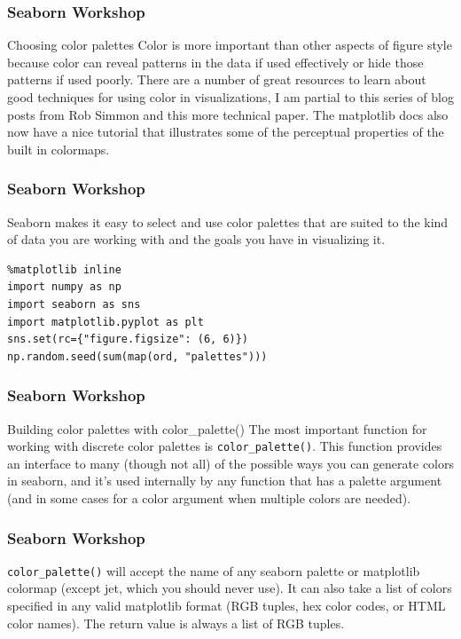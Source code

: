 \documentclass{beamer}
\begin{document}
\begin{frame}[fragile]
\frametitle{Seaborn Workshop}
\large

Choosing color palettes
Color is more important than other aspects of figure style because color can reveal patterns in the data if used effectively or hide those patterns if used poorly. There are a number of great resources to learn about good techniques for using color in visualizations, I am partial to this series of blog posts from Rob Simmon and this more technical paper. The matplotlib docs also now have a nice tutorial that illustrates some of the perceptual properties of the built in colormaps.
\end{frame}
\begin{frame}[fragile]
\frametitle{Seaborn Workshop}
\large
Seaborn makes it easy to select and use color palettes that are suited to the kind of data you are working with and the goals you have in visualizing it.
\begin{framed}
\begin{verbatim}
%matplotlib inline
import numpy as np
import seaborn as sns
import matplotlib.pyplot as plt
sns.set(rc={"figure.figsize": (6, 6)})
np.random.seed(sum(map(ord, "palettes")))
\end{verbatim}
\end{framed}

\end{frame}
\begin{frame}[fragile]
\frametitle{Seaborn Workshop}
\large

Building color palettes with color\_palette()
The most important function for working with discrete color palettes is \texttt{color\_palette()}. This function provides an interface to many (though not all) of the possible ways you can generate colors in seaborn, and it’s used internally by any function that has a palette argument (and in some cases for a color argument when multiple colors are needed).
\end{frame}
\begin{frame}[fragile]
	\frametitle{Seaborn Workshop}
	\large
	
	
\texttt{color\_palette()} will accept the name of any seaborn palette or matplotlib colormap (except jet, which you should never use). It can also take a list of colors specified in any valid matplotlib format (RGB tuples, hex color codes, or HTML color names). The return value is always a list of RGB tuples.
\end{frame}
\end{document}
